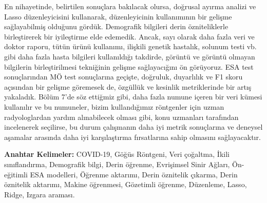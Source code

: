 En nihayetinde, belirtilen sonuçlara bakılacak olursa, doğrusal ayırma analizi ve Lasso düzenleyicisini kullanarak, düzenleyicinin kullanımının bir gelişme sağlayabilmiş olduğunu gördük. Demografik bilgileri derin özniteliklerle birleştirerek bir iyileştirme elde edemedik. Ancak, sayı olarak daha fazla veri ve doktor raporu, tütün ürünü kullanımı, ilişkili genetik hastalık, solunum testi vb. gibi daha fazla hasta bilgileri kullanıldığı takdirde, görüntü ve görüntü olmayan bilgilerin birleştirilmesi tekniğinin gelişme sağlayacığını ön görüyoruz. ESA test sonuçlarından MÖ test sonuçlarına geçişte, doğruluk, duyarlılık ve F1 skoru açısından bir gelişme göremesek de, özgüllük ve kesinlik metriklerinde bir artış yakaladık. Bölüm 7'de söz ettiğmiz gibi, daha fazla numune içeren bir veri kümesi kullanılır ve bu numuneler, bizim kullandığımız röntgenler için uzman radyologlardan yardım alınabilecek olması gibi, konu uzmanları tarafından incelenerek seçilirse, bu durum çalışmanın daha iyi metrik sonuçlarına ve deneysel aşamalar arasında daha iyi karşılaştırma fırsatlarına sahip olmasını sağlayacaktır.

\textbf{Anahtar Kelimeler:} COVID-19, Göğüs Röntgeni, Veri çoğaltma, İkili sınıflandırma, Demografik bilgi, Derin öğrenme, Evrişimsel Sinir Ağları, Ön-eğitimli ESA modelleri, Öğrenme aktarımı, Derin öznitelik çıkarma, Derin öznitelik aktarımı, Makine öğrenmesi, Gözetimli öğrenme, Düzenleme, Lasso, Ridge, Izgara araması.